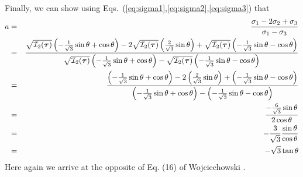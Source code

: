 Finally, we can show using Eqs.~(\ref{eq:sigma1},\ref{eq:sigma2},\ref{eq:sigma3}) that
\begin{eqnarray}
a 
&=&\frac{\sigma_1-2\sigma_2+\sigma_3}{\sigma_1-\sigma_3} \nonumber\\
&=& 
\frac{
\sqrt{{\cal I}_2({\bm \tau})} \left(-\frac{1}{\sqrt{3}}\sin \theta +\cos\theta \right) 
-2
\sqrt{{\cal I}_2({\bm \tau})} \left(\frac{2}{\sqrt{3}}\sin \theta   \right)   
+
\sqrt{{\cal I}_2({\bm \tau})} \left(-\frac{1}{\sqrt{3}}\sin \theta- \cos \theta \right)  
}{
\sqrt{{\cal I}_2({\bm \tau})} \left(-\frac{1}{\sqrt{3}}\sin \theta +\cos\theta \right)
- 
\sqrt{{\cal I}_2({\bm \tau})} \left(-\frac{1}{\sqrt{3}}\sin \theta- \cos \theta \right)  
}
\nonumber \\
&=& 
\frac{
\left(-\frac{1}{\sqrt{3}}\sin \theta +\cos\theta \right) 
-2
\left(\frac{2}{\sqrt{3}}\sin \theta   \right)   
+
\left(-\frac{1}{\sqrt{3}}\sin \theta- \cos \theta \right)  
}{
\left(-\frac{1}{\sqrt{3}}\sin \theta +\cos\theta \right)
- 
\left(-\frac{1}{\sqrt{3}}\sin \theta- \cos \theta \right)  
}
\nonumber \\
&=& 
\frac{
-\frac{6}{\sqrt{3}}\sin \theta  
}
{
2\cos\theta
}
\nonumber\\
&=& -\frac{3}{\sqrt{3}} \frac{\sin\theta}{\cos\theta} \nonumber\\
&=& -\sqrt{3} \tan\theta
\end{eqnarray}
Here again we arrive at the opposite of Eq. (16) of Wojciechowski \cite{wojc18}. 

























